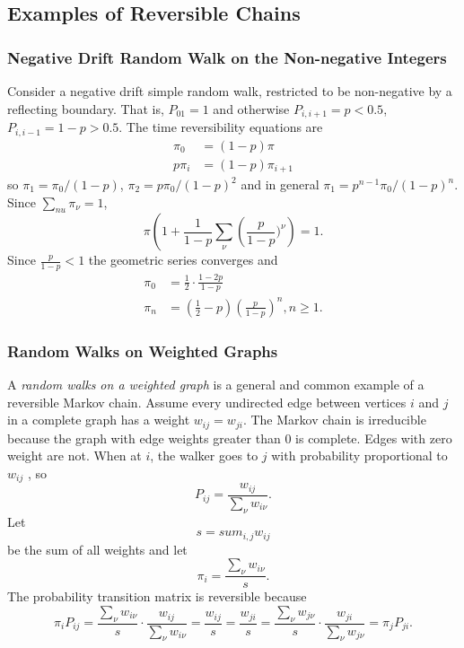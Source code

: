 \documentclass[12pt]{article}
\begin{document}
\subsection*{Examples of Reversible Chains}

\subsubsection*{Negative Drift Random Walk on the Non-negative
  Integers}

Consider a negative drift simple
random walk, restricted to be non-negative by a reflecting boundary.
That is,  $P_{01} = 1$ and otherwise $P_{i,i+1} = p <
0.5$, $P_{i,i-1} = 1 - p > 0.5$.  
The time reversibility equations are
\begin{align*}
  \pi_0 &= (1-p) \pi \\
  p \pi_{i} &= (1-p) \pi_{i+1}
\end{align*}
so $\pi_1 = \pi_0/(1-p)$, $\pi_2 = p\pi_0/(1-p)^{2}$ and in general
$\pi_1 = p^{n-1} \pi_0/(1-p)^n$.  Since $\sum_{nu} \pi_{\nu} = 1$,
\[
  \pi \left( 1 + \frac{1}{1-p} \sum_{\nu} \left( \frac{p}{1-p} )^{\nu}
    \right) = 1.
  \]
  Since $\frac{p}{1-p} < 1$ the geometric series converges and
  \begin{align*}
    \pi_0 &= \frac{1}{2}\cdot \frac{1-2p}{1-p} \\
    \pi_n &= \left( \frac{1}{2} - p \right) \left(  \frac{p}{1-p}
            \right)^n, n \ge 1.
  \end{align*}
  
\subsubsection*{Random Walks on Weighted Graphs}
 A \emph{random walks on a weighted graph}
  is a general and common example of a reversible Markov
  chain. Assume every undirected edge between vertices $i$ and $j$
in a complete graph has a weight $w_{ij} = w_{ji}$.  The Markov chain
is irreducible because the graph with edge weights greater than $0$ is complete. Edges with zero
weight are not.  When at $i$, the walker goes to $j$ with probability proportional
to $w_{ij}$ , so
\[
  P_{ij} = \frac{w_{ij}}{\sum_{\nu} w_{i\nu}}.
\]
Let
\[
  s = sum_{i,j} w_{ij}
\]
be the sum of all weights and let
\[
  \pi_i = \frac{\sum_{\nu} w_{i\nu}}{s}.
\]
The  probability transition matrix is reversible because
\[
  \pi_i P_{ij} = \frac{\sum_{\nu} w_{i\nu}}{s} \cdot
  \frac{w_{ij}}{\sum_{\nu} w_{i\nu}} = \frac{w_{ij}}{s} =
  \frac{w_{ji}}{s} = \frac{\sum_{\nu} w_{j\nu}}{s} \cdot
  \frac{w_{ji}}{\sum_{\nu} w_{j\nu}} = \pi_j P_{ji}.
\]
\end{document}
